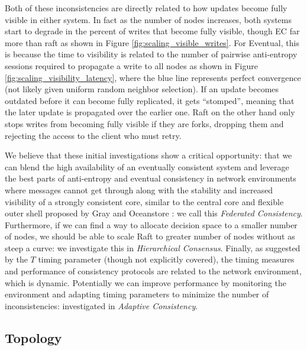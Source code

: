\documentclass{article}
\begin{document}
Both of these inconsistencies are directly related to how updates become fully visible in either system. In fact as the number of nodes increases, both systems start to degrade in the percent of writes that become fully visible, though EC far more than raft as shown in Figure \ref{fig:scaling_visible_writes}. For Eventual, this is because the time to visibility is related to the number of pairwise anti-entropy sessions required to propagate a write to all nodes as shown in Figure \ref{fig:scaling_visibility_latency}, where the blue line represents perfect convergence (not likely given uniform random neighbor selection). If an update becomes outdated before it can become fully replicated, it gets ``stomped'', meaning that the later update is propagated over the earlier one. Raft on the other hand only stops writes from becoming fully visible if they are forks, dropping them and rejecting the access to the client who must retry.

We believe that these initial investigations show a critical opportunity: that we can blend the high availability of an eventually consistent system and leverage the best parts of anti-entropy and eventual consistency in network environments where messages cannot get through along with the stability and increased visibility of a strongly consistent core, similar to the central core and flexible outer shell proposed by Gray and Oceanstore \cite{gray_dangers_1996,kubiatowicz_oceanstore:_2000}: we call this \textit{Federated Consistency}. Furthermore, if we can find a way to allocate decision space to a smaller number of nodes, we should be able to scale Raft to greater number of nodes without as steep a curve: we investigate this in \textit{Hierarchical Consensus}. Finally, as suggested by the $T$ timing parameter (though not explicitly covered), the timing measures and performance of consistency protocols are related to the network environment, which is dynamic. Potentially we can improve performance by monitoring the environment and adapting timing parameters to minimize the number of inconsistencies: investigated in \textit{Adaptive Consistency}.

\subsection{Topology}
\end{document}

